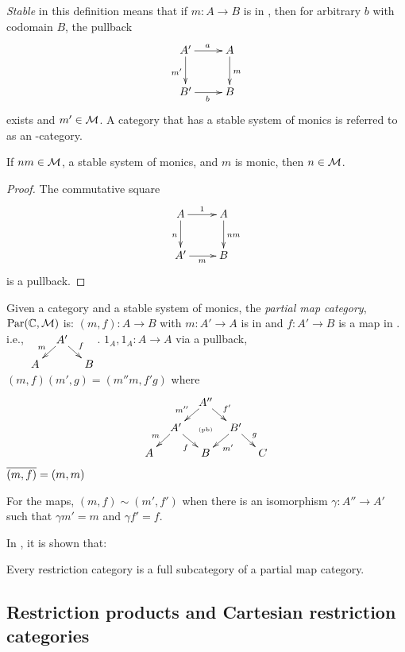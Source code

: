     \emph{Stable} in this definition means that if $m:A\to B$ is in \Mstab, then for arbitrary 
    $b$ with codomain $B$, the pullback
    \[
      \xymatrix{
        A'\ar[r]^a \ar[d]_{m'} &A\ar[d]^{m}\\
        B' \ar[r]_{b} & B
      }
    \]
    exists and $m' \in \mathcal{M}$. A category that has a stable system of monics
    is referred to as an \Mstab-category.

    \begin{lemma}
      If $nm \in \mathcal{M}$, a stable system of monics, and $m$ is monic, then $n \in \mathcal{M}$.
    \end{lemma}
    \begin{proof}
      The commutative square
      \[
        \xymatrix{
          A\ar[d]_n \ar[r]^{1} &A\ar[d]^{nm}\\
          A' \ar[r]_{m} & B
        }
      \] 
      is a pullback.
    \end{proof}

    Given a category \C and a stable system of monics, the \emph{partial map category}, 
    $\text{Par}(\mathbb{C},\mathcal{M})$ is:
        {$(m,f):A\to B$  with $m:A' \to A$ is in \Mstab and $f:A' \to B$ is a map in \C. i.e.,
          $\xymatrix @R-15pt @C-15pt{&A'\ar[dl]_{m} \ar[dr]^{f}\\A&&B}$.}
        {$1_A,1_A:A \to A$}
        {via a pullback, $(m,f)(m',g) = (m'' m, f' g)$ where
          \[
            \xymatrix @C-15pt @R-15pt{
              &&A''\ar[dl]_{m''}\ar[dr]^{f'}\\
              &A'\ar[dl]_{m}\ar[dr]_{f}&\text{{\tiny (pb)}}&B'\ar[dl]^{m'}\ar[dr]^{g}\\
              A&&B&&C
            }
          \]
        }
        {$\overline{(m,f)} = (m,m)$}

    For the maps, $(m,f) \sim (m',f')$ when there is an isomorphism $\gamma : A'' \to A'$ 
    such that $\gamma m' = m$ and $\gamma f' = f$.

    In \cite{cockettlack2003:restcategories2}, it is shown that:
    \begin{theorem}
      Every restriction category is a full subcategory of a partial map category.
    \end{theorem}
  \subsection{Restriction products and Cartesian restriction categories} %
    \label{sub:restriction_products_and_cartesian_restriction_categories}


